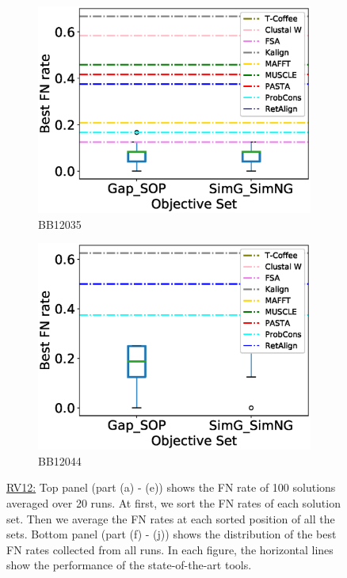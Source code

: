 \begin{figure}[!htbp]
\begin{adjustwidth}{-1.5cm}{-1cm}
\begin{subfigure}{0.22\textwidth}
			\includegraphics[width=\columnwidth]{Figure/summary/precomputedInit/Balibase/BB12035_objset_fnrate_rank}
			\caption{BB12035}
		\end{subfigure}
		\begin{subfigure}{0.22\textwidth}
			\includegraphics[width=\columnwidth]{Figure/summary/precomputedInit/Balibase/BB12044_objset_fnrate_rank}
			\caption{BB12044}
		\end{subfigure}
		\end{adjustwidth}
		\caption[FN rate results on RV12]{\underline{RV12:} Top panel (part (a) - (e)) shows the FN rate of 100 solutions averaged over 20 runs. At first, we sort the FN rates of each solution set. Then we average the FN rates at each sorted position of all the sets. Bottom panel (part (f) - (j)) shows the distribution of the best FN rates collected from all runs. In each figure, the horizontal lines show the performance of the state-of-the-art tools.}
		\label{fig:rv12_fn_rate}

\end{figure}


